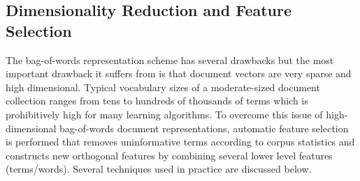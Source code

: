 
\subsection{Dimensionality Reduction and Feature Selection}
\label{sec:rw_dr}
The bag-of-words representation scheme has several drawbacks but the most important drawback it suffers from is that document vectors are very sparse and high dimensional. Typical vocabulary sizes of a moderate-sized document collection ranges from tens to hundreds of thousands of terms which is prohibitively high for many learning algorithms. 
To overcome this issue of high-dimensional bag-of-words document representations, automatic feature selection is performed that removes uninformative terms according to corpus statistics and constructs new orthogonal features by combining several lower level features (terms/words). Several techniques used in practice are discussed below.

